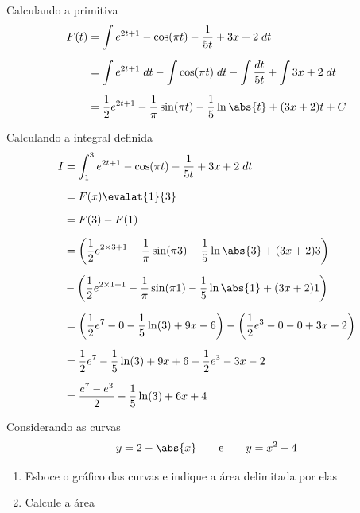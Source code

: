 \documentclass[a4paper,12pt,fleqn]{article}
\begin{document}
\begin{answer}
  Calculando a primitiva
  \begin{align*}
    F(t) & = \int e^{2t+1} - \cos(\pi t) - \frac{1}{5t} + 3x + 2 \;dt \\[2mm]
         & = \int e^{2t+1} \;dt
           - \int \cos(\pi t) \;dt
           - \int \frac{dt}{5t}
           + \int 3x + 2 \;dt \\[2mm]
         & = \frac{1}{2}e^{2t+1}
           - \frac{1}{\pi}\sin(\pi t)
           - \frac{1}{5}\ln\abs{t}
           + (3x + 2) t + C
  \end{align*}

  Calculando a integral definida
  \begin{align*}
    I & = \int_1^3 e^{2t+1} - \cos(\pi t) - \frac{1}{5t} + 3x + 2 \;dt \\[2mm]
      & = F(x)\evalat{1}{3}                 \\[2mm]
      & = F(3) - F(1)                       \\[2mm]
      & = \left(\frac{1}{2}e^{2\times3+1}
              - \frac{1}{\pi}\sin(\pi 3)
              - \frac{1}{5}\ln\abs{3}
              + (3x + 2) 3\right)           \\[2mm]
      & - \left(\frac{1}{2}e^{2\times1+1}
              - \frac{1}{\pi}\sin(\pi 1)
              - \frac{1}{5}\ln\abs{1}
              + (3x + 2) 1\right)           \\[2mm]
      & = \left(\frac{1}{2}e^7
              - 0
              - \frac{1}{5}\ln(3)
              + 9x -6 \right)
        - \left(\frac{1}{2}e^3
              - 0
              - 0
              + 3x + 2\right)               \\[2mm]
      & = \frac{1}{2}e^7
        - \frac{1}{5}\ln(3)
        + 9x +6
        - \frac{1}{2}e^3
        - 3x - 2                            \\[2mm]
      & = \frac{e^7-e^3}{2}
        - \frac{1}{5}\ln(3)
        + 6x + 4
  \end{align*}
\end{answer}

Considerando as curvas
\[
  y = 2 - \abs{x}
  \qquad\text{e}\qquad
  y = x^2 - 4
\]
\begin{enumerate}[label=\alph*)]
  \item Esboce o gráfico das curvas e indique a área delimitada por elas
  \item Calcule a área
\end{enumerate}
\end{document}
